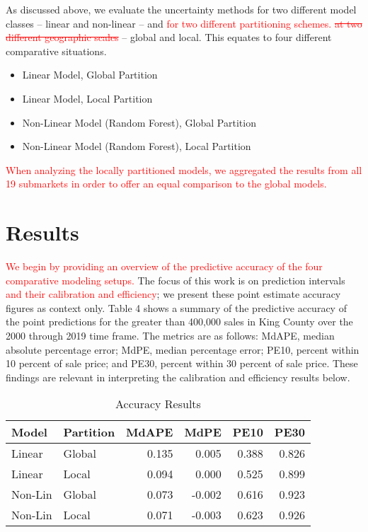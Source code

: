 \documentclass[colTwo]{anon}
\theoremstyle{definition}
\begin{document}
As discussed above, we evaluate the uncertainty methods for two different model classes -- linear and non-linear -- and \textcolor{red}{for two different partitioning schemes. \st{at two different geographic scales}} -- global and local.  This equates to four different comparative situations. 

\begin{itemize}
\item Linear Model, Global Partition
\item Linear Model, Local Partition
\item Non-Linear Model (Random Forest), Global Partition
\item Non-Linear Model (Random Forest), Local Partition
\end{itemize}

\textcolor{red}{When analyzing the locally partitioned models, we aggregated the results from all 19 submarkets in order to offer an equal comparison to the global models.}

\section{Results}

\textcolor{red}{We begin by providing an overview of the predictive accuracy of the four comparative modeling setups.} The focus of this work is on prediction intervals \textcolor{red}{and their calibration and efficiency}; we present these point estimate accuracy figures as context only. Table 4 shows a summary of the predictive accuracy of the point predictions for the greater than 400,000 sales in King County over the 2000 through 2019 time frame. The metrics are as follows: MdAPE, median absolute percentage error; MdPE, median percentage error; PE10, percent within 10 percent of sale price; and PE30, percent within 30 percent of sale price. These findings are relevant in interpreting the calibration and efficiency results below. 

\begin{table}[h!]
\centering
\footnotesize
\begin{tabular}{l|l|r|r|r|r}
\hline
\textbf{Model} & \textbf{Partition} & \textbf{MdAPE} & \textbf{MdPE} & \textbf{PE10} & \textbf{PE30}\\
\hline
Linear & Global & 0.135 & 0.005 & 0.388 & 0.826\\
Linear & Local & 0.094 & 0.000 & 0.525 & 0.899\\
\hline
Non-Lin & Global & 0.073 & -0.002 & 0.616 & 0.923\\
Non-Lin & Local & 0.071 & -0.003 & 0.623 & 0.926\\
\hline
\end{tabular}
\caption{Accuracy Results}
\label{table:4}
\end{table}
\end{document}
